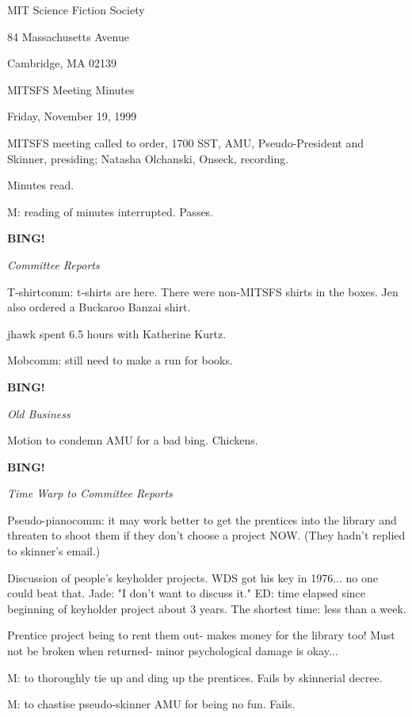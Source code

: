 \documentclass[12pt]{article}
\newcommand{\bing}{{\bf BING!} }
\newcommand{\goto}[1]{\bing \vskip 12pt \centerline{{\em{#1}}}}
\begin{document}
\begin{center}

MIT Science Fiction Society 

84 Massachusetts Avenue

Cambridge, MA 02139

\vspace{12pt}

MITSFS Meeting Minutes 

Friday, November 19, 1999

\end{center}
 
\vspace{18pt}

\setlength{\parskip}{6pt}

\noindent
MITSFS meeting called to order, 1700 SST,
AMU, Pseudo-President and Skinner, presiding; Natasha Olchanski, Onseck, recording.

Minutes read.

M: reading of minutes interrupted. Passes.

\goto{Committee Reports}

T-shirtcomm: t-shirts are here. There were non-MITSFS shirts in the boxes. Jen also ordered a Buckaroo Banzai shirt.

jhawk spent 6.5 hours with Katherine Kurtz.

Mobcomm: still need to make a run for books.

\goto{Old Business}

Motion to condemn AMU for a bad bing. Chickens.

\goto{Time Warp to Committee Reports}

Pseudo-pianocomm: it may work better to get the prentices into the library and threaten to shoot them if they don't choose a project NOW. (They hadn't replied to skinner's email.)

Discussion of people's keyholder projects. WDS got his key in 1976... no one could beat that. Jade: "I don't want to discuss it." ED: time elapsed since beginning of keyholder project about 3 years. The shortest time: less than a week.

Prentice project being to rent them out- makes money for the library too! Must not be broken when returned- minor psychological damage is okay...

M: to thoroughly tie up and ding up the prentices. Fails by skinnerial decree.

M: to chastise pseudo-skinner AMU for being no fun. Fails.
\end{document}
